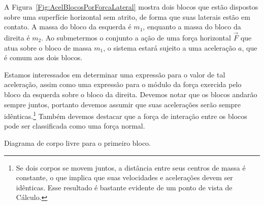 A Figura~\ref{Fig:AcelBlocosPorForcaLateral} mostra dois blocos que estão dispostos sobre uma superfície horizontal sem atrito, de forma que suas laterais estão em contato. A massa do bloco da esquerda é $m_1$, enquanto a massa do bloco da direita é $m_2$. Ao submetermos o conjunto a ação de uma força horizontal $\vec{F}$ que atua sobre o bloco de massa $m_1$, o sistema estará sujeito a uma aceleração $a$, que é comum aos dois blocos.

Estamos interessados em determinar uma expressão para o valor de tal aceleração, assim como uma expressão para o módulo da força exercida pelo bloco da esquerda sobre o bloco da direita. Devemos notar que os blocos andarão sempre juntos, portanto devemos assumir que suas acelerações serão sempre idênticas.\footnote[][-3cm]{Se dois corpos se movem juntos, a distância entre seus centros de massa é constante, o que implica que suas velocidades e acelerações devem ser idênticas. Esse resultado é bastante evidente de um ponto de vista de Cálculo.} Também devemos destacar que a força de interação entre os blocos pode ser classificada como uma força normal.

\begin{marginfigure}
\centering
{}
\caption{Diagrama de corpo livre para o primeiro bloco.\label{Fig:AcelBlocosPorForcaLateral:DiagBloco1}}
\end{marginfigure}

